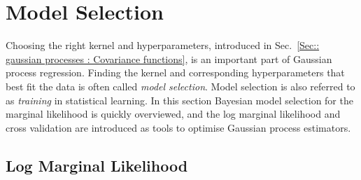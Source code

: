 \documentclass[twoside,english]{uiofysmaster}
\begin{document}
{{\section{Model Selection}

Choosing the right kernel and hyperparameters, introduced in Sec.~\ref{Sec:: gaussian processes : Covariance functions}, is an important part of Gaussian process regression. Finding the  kernel and corresponding hyperparameters that best fit the data is often called \textit{model selection}. Model selection is also referred to as \textit{training} in statistical learning. In this section Bayesian model selection for the marginal likelihood is quickly overviewed, and the log marginal likelihood and cross validation are introduced as tools to optimise Gaussian process estimators.

\subsection{Log Marginal Likelihood}\label{Sec:: gaussian process : Log Marginal Likelihood}

}}
\end{document}
